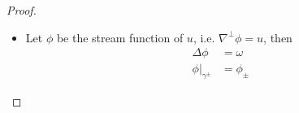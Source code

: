 \documentclass{article}
\theoremstyle{definition}
\theoremstyle{definition}
\begin{document}
\begin{proof}
\begin{itemize}
    \begin{equation}
        \label{appendix-gradu-equals-omega+boundary-2}
        \begin{aligned}
            -\int_{\gamma^-\cup\gamma^+} u_\tau \omega &= -\int_{\gamma^-\cup\gamma^+} u_\tau \tau \cdot (\tau\cdot \nabla^\perp) u - \int_{\gamma^-\cup\gamma^+} u_\tau n \cdot (n\cdot \nabla^\perp) u
            \\
            &= -\int_{\gamma^-\cup\gamma^+} u \cdot (n\cdot \nabla) u + \int_{\gamma^-\cup\gamma^+} n \cdot (u\cdot \nabla) u,
        \end{aligned}
    \end{equation}
    where in the last identity we used that $\tau\cdot \nabla^\perp = -\tau^\perp \cdot \nabla=n \cdot\nabla$ and $u_\tau n\cdot\nabla^\perp= -u_\tau\cdot n^\perp \cdot\nabla = -u_\tau \tau  \cdot\nabla=-u\cdot\nabla$.
    The first term on the right-hand side of \eqref{appendix-gradu-equals-omega+boundary-1} cancels with the first term on the right-hand side of \eqref{appendix-gradu-equals-omega+boundary-2}, implying
    \begin{align*}
        \|\nabla u\|_2^2 = \int_{\gamma^-\cup\gamma^+} n\cdot (u\cdot \nabla) u + \|\omega\|_2^2
    \end{align*}
    Finally using 
    \begin{align}
        \label{id-kappaUtau2-2}
        n\cdot (u\cdot \nabla) u = \kappa u_\tau^2
    \end{align}
    on $\gamma^-\cup\gamma^+$, which is proven in \eqref{appendix-proof-id-kappaUtau2} in the Appendix, yields the claim.
    \item 
    Let $\phi$ be the stream function of $u$, i.e. $\nabla^\perp\phi=u$, then
    \begin{align*}
        \Delta \phi &= \omega\\
        \phi\vert_{\gamma^\pm} &= \phi_\pm
    \end{align*}

\end{itemize}
\end{proof}
\end{document}
